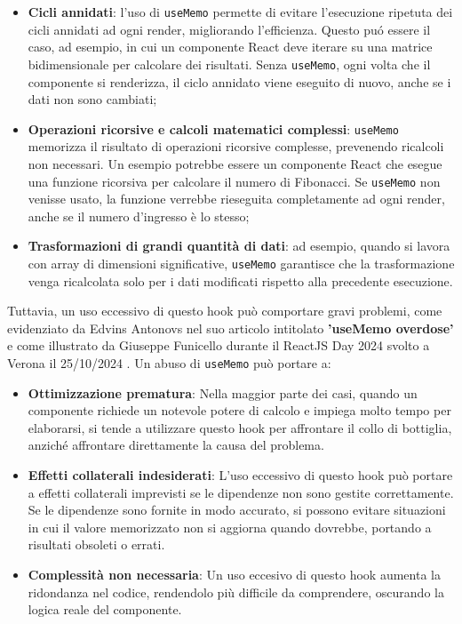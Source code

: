 \documentclass[target=bach,aauheader=,style=]{thud}
\begin{document}
\begin{itemize}
    \item \textbf{Cicli annidati}: l'uso di \texttt{useMemo} permette di evitare l'esecuzione ripetuta dei cicli annidati ad ogni render, migliorando l'efficienza. Questo puó essere il caso, ad esempio, in cui un componente React deve iterare su una matrice bidimensionale per calcolare dei risultati. Senza \texttt{useMemo}, ogni volta che il componente si renderizza, il ciclo annidato viene eseguito di nuovo, anche se i dati non sono cambiati;
    \item \textbf{Operazioni ricorsive e calcoli matematici complessi}: \texttt{useMemo} memorizza il risultato di operazioni ricorsive complesse, prevenendo ricalcoli non necessari. Un esempio potrebbe essere un componente React che esegue una funzione ricorsiva per calcolare il numero di Fibonacci. Se \texttt{useMemo} non venisse usato, la funzione verrebbe rieseguita completamente ad ogni render, anche se il numero d'ingresso è lo stesso;
    \item \textbf{Trasformazioni di grandi quantità di dati}: ad esempio, quando si lavora con array di dimensioni significative, \texttt{useMemo} garantisce che la trasformazione venga ricalcolata solo per i dati modificati rispetto alla precedente esecuzione.
\end{itemize}

\noindent Tuttavia, un uso eccessivo di questo hook può comportare gravi problemi, come evidenziato da Edvins Antonovs nel suo articolo intitolato \textbf{'useMemo overdose'} \cite{edvins2024usememo} e come illustrato da Giuseppe Funicello durante il ReactJS Day 2024 svolto a Verona il 25/10/2024 \cite{funicello2024reactjsday}. Un abuso di \texttt{useMemo} può portare a:

\begin{itemize}
    \item \textbf{Ottimizzazione prematura}: Nella maggior parte dei casi, quando un componente richiede un notevole potere di calcolo e impiega molto tempo per elaborarsi, si tende a utilizzare questo hook per affrontare il collo di bottiglia, anziché affrontare direttamente la causa del problema.
    \item \textbf{Effetti collaterali indesiderati}: L'uso eccessivo di questo hook può portare a effetti collaterali imprevisti se le dipendenze non sono gestite correttamente. Se le dipendenze sono fornite in modo accurato, si possono evitare situazioni in cui il valore memorizzato non si aggiorna quando dovrebbe, portando a risultati obsoleti o errati.
    \item \textbf{Complessità non necessaria}: Un uso eccesivo di questo hook aumenta la ridondanza nel codice, rendendolo più difficile da comprendere, oscurando la logica reale del componente.
\end{itemize}
\end{document}
